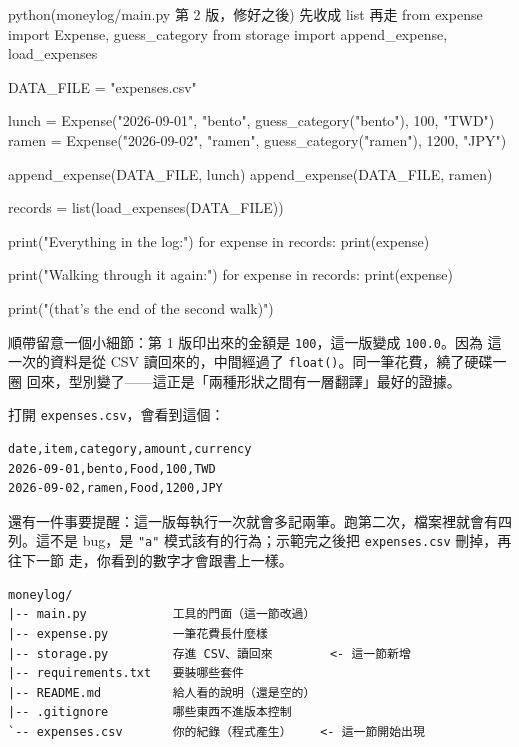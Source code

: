\begin{example}{python}{(moneylog/main.py 第 2 版，修好之後) 先收成 list 再走}
from expense import Expense, guess_category
from storage import append_expense, load_expenses

DATA_FILE = "expenses.csv"

lunch = Expense("2026-09-01", "bento", guess_category("bento"), 100, "TWD")
ramen = Expense("2026-09-02", "ramen", guess_category("ramen"), 1200, "JPY")

append_expense(DATA_FILE, lunch)
append_expense(DATA_FILE, ramen)

records = list(load_expenses(DATA_FILE))

print("Everything in the log:")
for expense in records:
    print(expense)

print("Walking through it again:")
for expense in records:
    print(expense)

print("(that's the end of the second walk)")
\end{example}


順帶留意一個小細節：第 1 版印出來的金額是 \texttt{100}，這一版變成 \texttt{100.0}。因為
這一次的資料是從 CSV 讀回來的，中間經過了 \texttt{float()}。同一筆花費，繞了硬碟一圈
回來，型別變了——這正是「兩種形狀之間有一層翻譯」最好的證據。

打開 \texttt{expenses.csv}，會看到這個：

\begin{verbatim}
date,item,category,amount,currency
2026-09-01,bento,Food,100,TWD
2026-09-02,ramen,Food,1200,JPY
\end{verbatim}

還有一件事要提醒：這一版每執行一次就會多記兩筆。跑第二次，檔案裡就會有四列。這不是
bug，是 \texttt{"a"} 模式該有的行為；示範完之後把 \texttt{expenses.csv} 刪掉，再往下一節
走，你看到的數字才會跟書上一樣。

\begin{verbatim}
moneylog/
|-- main.py            工具的門面（這一節改過）
|-- expense.py         一筆花費長什麼樣
|-- storage.py         存進 CSV、讀回來        <- 這一節新增
|-- requirements.txt   要裝哪些套件
|-- README.md          給人看的說明（還是空的）
|-- .gitignore         哪些東西不進版本控制
`-- expenses.csv       你的紀錄（程式產生）    <- 這一節開始出現
\end{verbatim}

